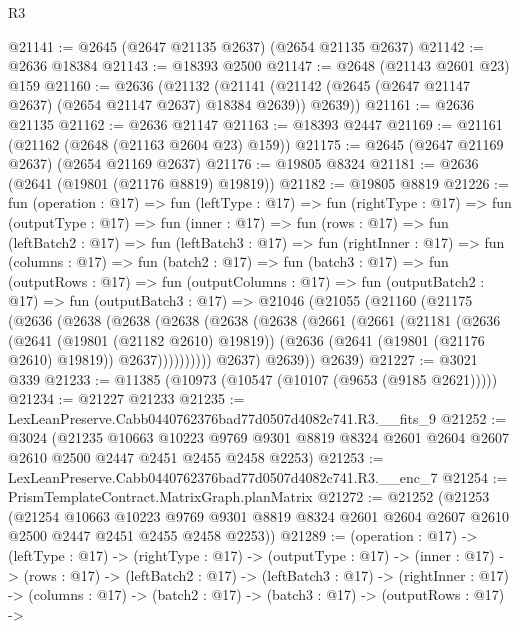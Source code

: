 \begin{lexlean}{R3}
\begin{coremodule}
@21141 := @2645 (@2647 @21135 @2637) (@2654 @21135 @2637)
@21142 := @2636 @18384
@21143 := @18393 @2500
@21147 := @2648 (@21143 @2601 @23) @159
@21160 := @2636
    (@21132 (@21141 (@21142 (@2645 (@2647 @21147 @2637) (@2654 @21147 @2637) @18384 @2639)) @2639))
@21161 := @2636 @21135
@21162 := @2636 @21147
@21163 := @18393 @2447
@21169 := @21161 (@21162 (@2648 (@21163 @2604 @23) @159))
@21175 := @2645 (@2647 @21169 @2637) (@2654 @21169 @2637)
@21176 := @19805 @8324
@21181 := @2636 (@2641 (@19801 (@21176 @8819) @19819))
@21182 := @19805 @8819
@21226 := fun (operation : @17) =>
  fun (leftType : @17) =>
  fun (rightType : @17) =>
  fun (outputType : @17) =>
  fun (inner : @17) =>
  fun (rows : @17) =>
  fun (leftBatch2 : @17) =>
  fun (leftBatch3 : @17) =>
  fun (rightInner : @17) =>
  fun (columns : @17) =>
  fun (batch2 : @17) =>
  fun (batch3 : @17) =>
  fun (outputRows : @17) =>
  fun (outputColumns : @17) =>
  fun (outputBatch2 : @17) =>
  fun (outputBatch3 : @17) =>
  @21046
    (@21055
      (@21160
        (@21175
          (@2636
            (@2638
              (@2638
                (@2638
                  (@2638
                    (@2638
                      (@2661
                        (@2661
                          (@21181
                            (@2636
                              (@2641 (@19801 (@21182 @2610) @19819))
                              (@2636 (@2641 (@19801 (@21176 @2610) @19819)) @2637))))))))))
            @2637)
          @2639))
      @2639)
@21227 := @3021 @339
@21233 := @11385 (@10973 (@10547 (@10107 (@9653 (@9185 @2621)))))
@21234 := @21227 @21233
@21235 := LexLeanPreserve.Cabb0440762376bad77d0507d4082c741.R3.__fits_9
@21252 := @3024
    (@21235
      @10663
      @10223
      @9769
      @9301
      @8819
      @8324
      @2601
      @2604
      @2607
      @2610
      @2500
      @2447
      @2451
      @2455
      @2458
      @2253)
@21253 := LexLeanPreserve.Cabb0440762376bad77d0507d4082c741.R3.__enc_7
@21254 := PrismTemplateContract.MatrixGraph.planMatrix
@21272 := @21252
    (@21253
      (@21254
        @10663
        @10223
        @9769
        @9301
        @8819
        @8324
        @2601
        @2604
        @2607
        @2610
        @2500
        @2447
        @2451
        @2455
        @2458
        @2253))
@21289 := (operation : @17) ->
  (leftType : @17) ->
  (rightType : @17) ->
  (outputType : @17) ->
  (inner : @17) ->
  (rows : @17) ->
  (leftBatch2 : @17) ->
  (leftBatch3 : @17) ->
  (rightInner : @17) ->
  (columns : @17) ->
  (batch2 : @17) ->
  (batch3 : @17) ->
  (outputRows : @17) ->

\end{coremodule}
\end{lexlean}
